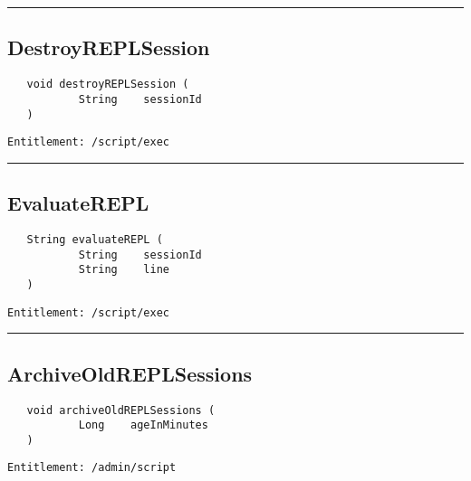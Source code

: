 \rule{12cm}{2pt}
\subsection{DestroyREPLSession}
\label{Api:DestroyREPLSession}
\begin{verbatim}
   void destroyREPLSession (
           String    sessionId
   )
\end{verbatim}
\begin{Verbatim}[fontsize=\small, formatcom=\color{Maroon}]
  Entitlement: /script/exec
\end{Verbatim}



\rule{12cm}{2pt}
\subsection{EvaluateREPL}
\label{Api:EvaluateREPL}
\begin{verbatim}
   String evaluateREPL (
           String    sessionId
           String    line
   )
\end{verbatim}
\begin{Verbatim}[fontsize=\small, formatcom=\color{Maroon}]
  Entitlement: /script/exec
\end{Verbatim}



\rule{12cm}{2pt}
\subsection{ArchiveOldREPLSessions}
\label{Api:ArchiveOldREPLSessions}
\begin{verbatim}
   void archiveOldREPLSessions (
           Long    ageInMinutes
   )
\end{verbatim}
\begin{Verbatim}[fontsize=\small, formatcom=\color{Maroon}]
  Entitlement: /admin/script
\end{Verbatim}



